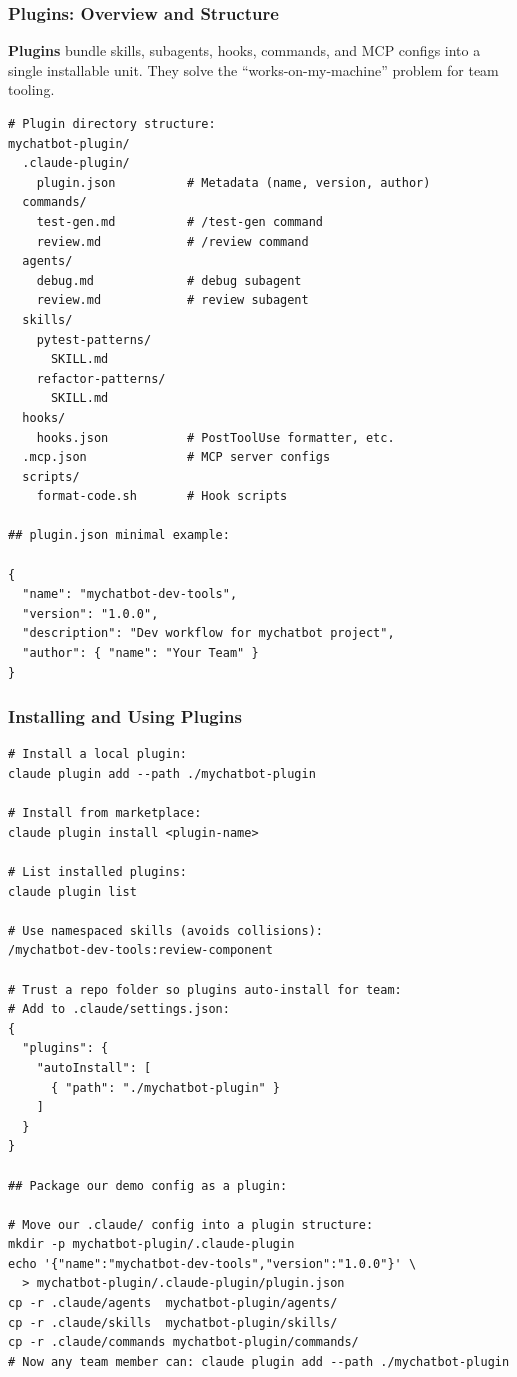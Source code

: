 \begin{frame}[fragile]\frametitle{Plugins: Overview and Structure}
\textbf{Plugins} bundle skills, subagents, hooks, commands, and MCP configs into a single installable unit. They solve the ``works-on-my-machine'' problem for team tooling.

\begin{lstlisting}
# Plugin directory structure:
mychatbot-plugin/
  .claude-plugin/
    plugin.json          # Metadata (name, version, author)
  commands/
    test-gen.md          # /test-gen command
    review.md            # /review command
  agents/
    debug.md             # debug subagent
    review.md            # review subagent
  skills/
    pytest-patterns/
      SKILL.md
    refactor-patterns/
      SKILL.md
  hooks/
    hooks.json           # PostToolUse formatter, etc.
  .mcp.json              # MCP server configs
  scripts/
    format-code.sh       # Hook scripts

## plugin.json minimal example:

{
  "name": "mychatbot-dev-tools",
  "version": "1.0.0",
  "description": "Dev workflow for mychatbot project",
  "author": { "name": "Your Team" }
}
\end{lstlisting}
\end{frame}


\begin{frame}[fragile]\frametitle{Installing and Using Plugins}
\begin{lstlisting}
# Install a local plugin:
claude plugin add --path ./mychatbot-plugin

# Install from marketplace:
claude plugin install <plugin-name>

# List installed plugins:
claude plugin list

# Use namespaced skills (avoids collisions):
/mychatbot-dev-tools:review-component

# Trust a repo folder so plugins auto-install for team:
# Add to .claude/settings.json:
{
  "plugins": {
    "autoInstall": [
      { "path": "./mychatbot-plugin" }
    ]
  }
}

## Package our demo config as a plugin:

# Move our .claude/ config into a plugin structure:
mkdir -p mychatbot-plugin/.claude-plugin
echo '{"name":"mychatbot-dev-tools","version":"1.0.0"}' \
  > mychatbot-plugin/.claude-plugin/plugin.json
cp -r .claude/agents  mychatbot-plugin/agents/
cp -r .claude/skills  mychatbot-plugin/skills/
cp -r .claude/commands mychatbot-plugin/commands/
# Now any team member can: claude plugin add --path ./mychatbot-plugin
\end{lstlisting}
\end{frame}


